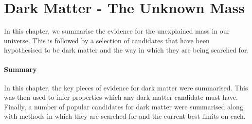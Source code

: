\chapter{Dark Matter - The Unknown Mass}
\label{chap:dark_matter_evidence}

\par
In this chapter, we summarise the evidence for the unexplained mass in our universe.
This is followed by a selection of candidates that have been hypothesised to be dark matter and the way in which they are being searched for.






\subsubsection*{Summary}
\par
In this chapter, the key pieces of evidence for dark matter were summarised.
This was then used to infer properties which any dark matter candidate must have.
Finally, a number of popular candidates for dark matter were summarised along with methods in which they are searched for and the current best limits on each.
